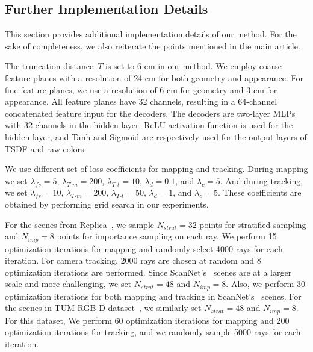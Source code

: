 \subsection{Further Implementation Details}
This section provides additional implementation details of our method. For the sake of completeness, we also reiterate the points mentioned in the main article.

The truncation distance~$T$ is set to 6 cm in our method. We employ coarse feature planes with a resolution of 24 cm for both geometry and appearance. For fine feature planes, we use a resolution of 6 cm for geometry and 3 cm for appearance. All feature planes have 32 channels, resulting in a 64-channel concatenated feature input for the decoders. The decoders are two-layer MLPs with 32 channels in the hidden layer. ReLU activation function is used for the hidden layer, and Tanh and Sigmoid are respectively used for the output layers of TSDF and raw colors.

We use different set of loss coefficients for mapping and tracking. During mapping we set $\lambda_{fs}=5$, $\lambda_{T\text{-}m}=200$, $\lambda_{T\text{-}t}=10$, $\lambda_{d}=0.1$, and $\lambda_{c}=5$. And during tracking, we set $\lambda_{fs}=10$, $\lambda_{T\text{-}m}=200$, $\lambda_{T\text{-}t}=50$, $\lambda_{d}=1$, and $\lambda_{c}=5$. These coefficients are obtained by performing grid search in our experiments.

For the scenes from Replica~\cite{replica19arxiv}, we sample $N_{strat}=32$ points for stratified sampling and $N_{imp}=8$ points for importance sampling on each ray. We perform 15 optimization iterations for mapping and randomly select 4000 rays for each iteration. For camera tracking, 2000 rays are chosen at random and 8 optimization iterations are performed. Since ScanNet's~\cite{dai2017scannet} scenes are at a larger scale and more challenging, we set $N_{strat}=48$ and $N_{imp}=8$. Also, we perform 30 optimization iterations for both mapping and tracking in ScanNet's~\cite{dai2017scannet} scenes. For the scenes in TUM RGB-D dataset~\cite{sturm2012benchmark}, we similarly set $N_{strat}=48$ and $N_{imp}=8$. For this dataset, We perform 60 optimization iterations for mapping and 200 optimization iterations for tracking, and we randomly sample 5000 rays for each iteration.

